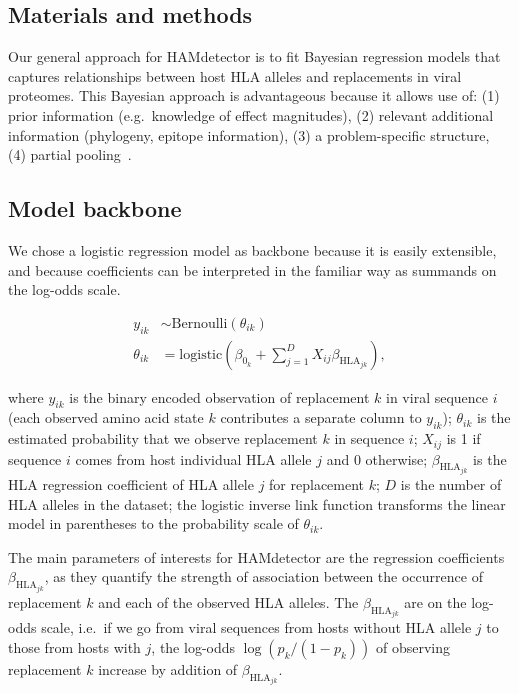 \documentclass{bioinfo}
\begin{document}
\begin{methods}
  \section{Materials and methods}

  Our general approach for HAMdetector is to fit Bayesian regression models that captures relationships between host HLA alleles and replacements in viral proteomes. This Bayesian approach is advantageous because it allows use of: (1) prior information (e.g.\ knowledge of effect magnitudes), (2) relevant additional information (phylogeny, epitope information), (3) a problem-specific structure, (4) partial pooling~\citep{Gelman2010}.
  
\subsection{Model backbone}

We chose a logistic regression model as backbone because it is easily extensible, and because coefficients can be interpreted in the familiar way as summands on the log-odds scale.

\begin{align}
\label{eq:backbone}
  y_{ik} & \sim \text{Bernoulli}(\theta_{ik}) \\
  \theta_{ik} & = \text{logistic}\left(\beta_{0_{k}} + \sum_{j=1}^{D} X_{ij}\beta_{\text{HLA}_{jk}}\right),
\end{align}

where \(y_{ik}\) is the binary encoded observation of replacement $k$ in viral sequence $i$ (each observed amino acid state $k$ contributes a separate column to $y_{ik}$); \(\theta_{ik}\) is the estimated probability that we observe replacement \(k\) in sequence \(i\); \(X_{ij}\) is 1 if sequence \(i\) comes from host individual HLA allele \(j\) and 0 otherwise; $\beta_{\text{HLA}_{jk}}$ is the HLA regression coefficient of HLA allele \(j\) for replacement \(k\); \(D\) is the number of HLA alleles in the dataset; the logistic inverse link function transforms the linear model in parentheses to the probability scale of $\theta_{ik}$.

The main parameters of interests for HAMdetector are the regression coefficients $\beta_{\text{HLA}_{jk}}$, as they quantify the strength of association between the occurrence of replacement \(k\) and each of the observed HLA alleles. The $\beta_{\text{HLA}_{jk}}$ are on the log-odds scale, i.e.\ if we go from viral sequences from hosts without HLA allele $j$ to those from hosts with $j$, the log-odds $\log (p_k/(1-p_k))$ of observing replacement \(k\) increase by addition of $\beta_{\text{HLA}_{jk}}$.


\end{methods}
\end{document}
